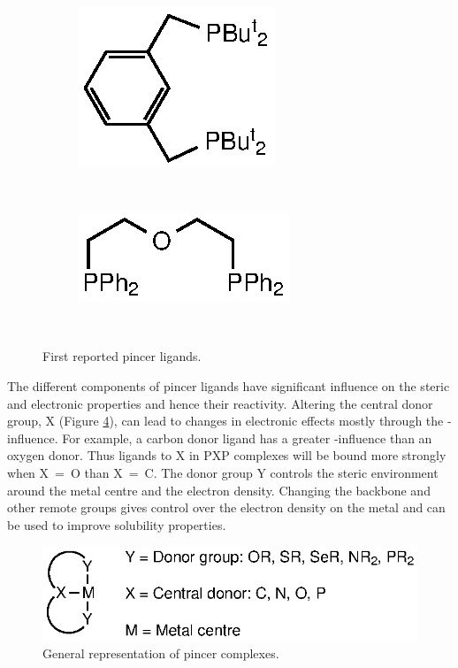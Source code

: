 \begin{figure}[htbp]
\centering
\begin{subfigure}[b]{0.3\textwidth}
	\centering
	\includegraphics{../Figures/Shaw.eps}
	\caption{}
	\label{ShawPCP}
\end{subfigure}
~
\begin{subfigure}[b]{0.3\textwidth}
	\centering
	\includegraphics{../Figures/Alcock.eps}
	\caption{}
	\label{AlcockPOP}
\end{subfigure}
\\
\caption[First reported pincer ligands]{First reported pincer ligands.}
\end{figure}

The different components of pincer ligands have significant influence on the steric and electronic properties and hence their reactivity.\cite{Singleton2003}  Altering the central donor group, X (Figure \ref{Pincerligands}), can lead to changes in electronic effects mostly through the \trans{}-influence.\cite{Choi2011}  For example, a carbon donor ligand has a greater \trans{}-influence than an oxygen donor.  Thus ligands \trans{} to X in PXP complexes will be bound more strongly when X~=~O than X~=~C.\cite{Zhu2008} The donor group Y controls the steric environment around the metal centre and the electron density.  Changing the backbone and other remote groups gives control over the electron density on the metal and can be used to improve solubility properties.\cite{Choi2011}

\begin{figure}[htbp]
\centering
\includegraphics{../Figures/Pincerligands.eps}
\caption[General representation of pincer complexes]{General representation of pincer complexes.}
\label{Pincerligands}
\end{figure}

